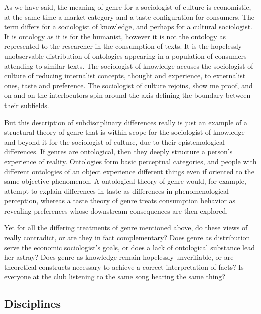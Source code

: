 \documentclass[]{book}
\theoremstyle{definition}
\theoremstyle{definition}
\theoremstyle{definition}
\theoremstyle{remark}
\begin{document}
As we have said, the meaning of genre for a sociologist of culture is
economistic, at the same time a market category and a taste
configuration for consumers. The term differs for a sociologist of
knowledge, and perhaps for a cultural sociologist. It is ontology as it
is for the humanist, however it is not the ontology as represented to
the researcher in the consumption of texts. It is the hopelessly
unobservable distribution of ontologies appearing in a population of
consumers attending to similar texts. The sociologist of knowledge
accuses the sociologist of culture of reducing internalist concepts,
thought and experience, to externalist ones, taste and preference. The
sociologist of culture rejoins, show me proof, and on and on the
interlocutors spin around the axis defining the boundary between their
subfields.

But this description of subdisciplinary differences really is just an
example of a structural theory of genre that is within scope for the
sociologist of knowledge and beyond it for the sociologist of culture,
due to their epistemological differences. If genres are ontological,
then they deeply structure a person's experience of reality. Ontologies
form basic perceptual categories, and people with different ontologies
of an object experience different things even if oriented to the same
objective phenomenon. A ontological theory of genre would, for example,
attempt to explain differences in taste as differences in
phenomenological perception, whereas a taste theory of genre treats
consumption behavior as revealing preferences whose downstream
consequences are then explored.

Yet for all the differing treatments of genre mentioned above, do these
views of really contradict, or are they in fact complementary? Does
genre as distribution serve the economic sociologist's goals, or does a
lack of ontological substance lead her astray? Does genre as knowledge
remain hopelessly unverifiable, or are theoretical constructs necessary
to achieve a correct interpretation of facts? Is everyone at the club
listening to the same song hearing the same thing?

\hypertarget{disciplines}{%
\subsection{Disciplines}\label{disciplines}}
\end{document}
